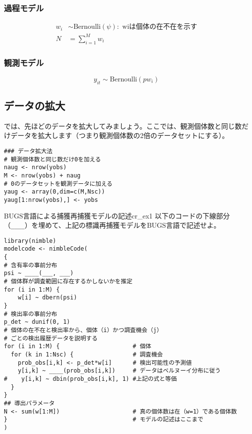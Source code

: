 		\subsubsection*{過程モデル}
\begin{align}
w_{i} &\sim \mathrm{Bernoulli}(\psi): \text{ wiは個体の在不在を示す} \\
N &= \sum_{i=1}^{M} w_{i}
\end{align}
		\subsubsection*{観測モデル}
\begin{equation}
y_{it} \sim \mathrm{Bernoulli}(p w_{i})
\end{equation}

	\subsection{データの拡大}
では、先ほどのデータを拡大してみましょう。ここでは、観測個体数と同じ数だけデータを拡大します（つまり観測個体数の2倍のデータセットにする）。
\begin{verbatim}
### データ拡大法
# 観測個体数と同じ数だけ0を加える
naug <- nrow(yobs)
M <- nrow(yobs) + naug
# 0のデータセットを観測データに加える
yaug <- array(0,dim=c(M,Nsc))
yaug[1:nrow(yobs),] <- yobs
\end{verbatim}

\begin{exercise}{BUGS言語による捕獲再捕獲モデルの記述}{cr_ex1}
以下のコードの下線部分（\verb|____|）を埋めて、上記の標識再捕獲モデルをBUGS言語で記述せよ。
\begin{verbatim}
library(nimble)
modelcode <- nimbleCode(
{
# 含有率の事前分布
psi ~ ____(___, ___)
# 個体群が調査範囲に存在するかしないかを推定
for (i in 1:M) {
    w[i] ~ dbern(psi)
}
# 検出率の事前分布
p_det ~ dunif(0, 1)
# 個体の在不在と検出率から、個体（i）かつ調査機会（j）
# ごとの検出履歴データを説明する
for (i in 1:M) {                     # 個体
  for (k in 1:Nsc) {                 # 調査機会
    prob_obs[i,k] <- p_det*w[i]      # 検出可能性の予測値
    y[i,k] ~ ____(prob_obs[i,k])     # データはベルヌーイ分布に従う
#    y[i,k] ~ dbin(prob_obs[i,k], 1) #上記の式と等価
  }
}
## 導出パラメータ
N <- sum(w[1:M])                     # 真の個体数は在（w=1）である個体数
}                                    # モデルの記述はここまで
)
\end{verbatim}
\end{exercise}
	
